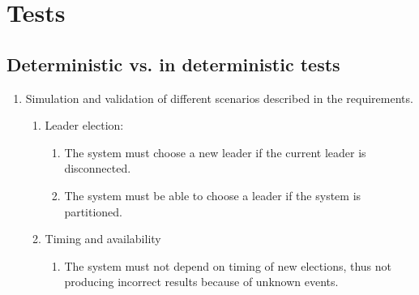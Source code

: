 \section{Tests}

\subsection{Deterministic vs. in deterministic tests}

\begin{enumerate}
\item Simulation and validation of different scenarios described in the requirements.
	\begin{enumerate}
	\item Leader election:
		\begin{enumerate}
		\item The system must choose a new leader if the current leader is disconnected.
		\item The system must be able to choose a leader if the system is partitioned.
		\end{enumerate}
	\item Timing and availability
		\begin{enumerate}
		\item The system must not depend on timing of new elections, thus not producing incorrect results because of unknown events.
		\end{enumerate}
	\end{enumerate}
\end{enumerate}